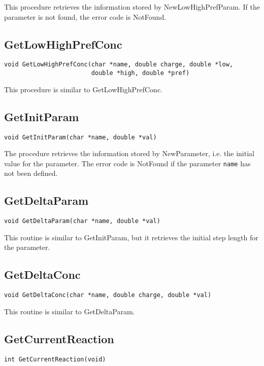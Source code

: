 This procedure retrieves the information stored by
NewLowHighPrefParam. If the parameter is not found, the error code is
NotFound.

\subsection{GetLowHighPrefConc}
\begin{verbatim}
void GetLowHighPrefConc(char *name, double charge, double *low,
                        double *high, double *pref)
\end{verbatim}

This procedure is similar to GetLowHighPrefConc.

\subsection{GetInitParam}
\begin{verbatim}
void GetInitParam(char *name, double *val)
\end{verbatim}

The procedure retrieves the information stored by NewParameter, i.e. the
initial value for the parameter. The error
code is NotFound if the parameter {\tt name} has not been defined.

\subsection{GetDeltaParam}
\begin{verbatim}
void GetDeltaParam(char *name, double *val)
\end{verbatim}

This routine is similar to GetInitParam, but it retrieves the initial
step length for the parameter. 

\subsection{GetDeltaConc}
\begin{verbatim}
void GetDeltaConc(char *name, double charge, double *val)
\end{verbatim}

This routine is similar to GetDeltaParam.

\subsection{GetCurrentReaction}
\begin{verbatim}
int GetCurrentReaction(void)
\end{verbatim}

